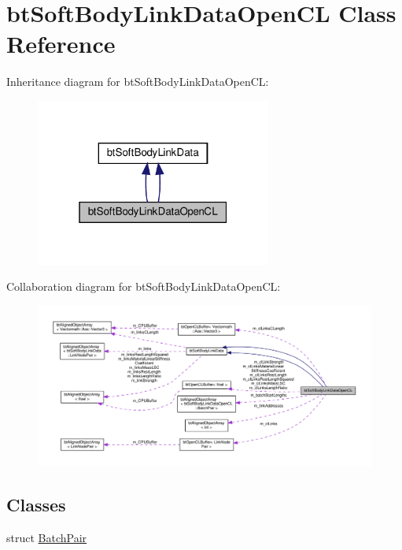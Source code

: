 \hypertarget{classbtSoftBodyLinkDataOpenCL}{}\section{bt\+Soft\+Body\+Link\+Data\+Open\+CL Class Reference}
\label{classbtSoftBodyLinkDataOpenCL}


Inheritance diagram for bt\+Soft\+Body\+Link\+Data\+Open\+CL\+:
\nopagebreak
\begin{figure}[H]
\begin{center}
\leavevmode
\includegraphics[width=220pt]{classbtSoftBodyLinkDataOpenCL__inherit__graph}
\end{center}
\end{figure}


Collaboration diagram for bt\+Soft\+Body\+Link\+Data\+Open\+CL\+:
\nopagebreak
\begin{figure}[H]
\begin{center}
\leavevmode
\includegraphics[width=350pt]{classbtSoftBodyLinkDataOpenCL__coll__graph}
\end{center}
\end{figure}
\subsection*{Classes}
\begin{DoxyCompactItemize}
\item 
struct \hyperlink{structbtSoftBodyLinkDataOpenCL_1_1BatchPair}{Batch\+Pair}
\end{DoxyCompactItemize}
